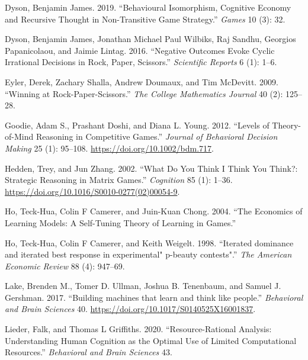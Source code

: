 \documentclass[smallextended]{svjour3}       %
\newlength{\cslhangindent}
\newenvironment{CSLReferences}[2] %
 {%
  \setlength{\parindent}{0pt}
  \ifodd #1 \everypar{\setlength{\hangindent}{\cslhangindent}}\ignorespaces\fi
  \ifnum #2 > 0
  \setlength{\parskip}{#2\baselineskip}
  \fi
 }%
 {}
\begin{document}
\begin{CSLReferences}{1}{0}
\leavevmode{}%
Dyson, Benjamin James. 2019. {``Behavioural Isomorphism, Cognitive
Economy and Recursive Thought in Non-Transitive Game Strategy.''}
\emph{Games} 10 (3): 32.

\leavevmode{}%
Dyson, Benjamin James, Jonathan Michael Paul Wilbiks, Raj Sandhu,
Georgios Papanicolaou, and Jaimie Lintag. 2016. {``Negative Outcomes
Evoke Cyclic Irrational Decisions in Rock, Paper, Scissors.''}
\emph{Scientific Reports} 6 (1): 1--6.

\leavevmode{}%
Eyler, Derek, Zachary Shalla, Andrew Doumaux, and Tim McDevitt. 2009.
{``Winning at Rock-Paper-Scissors.''} \emph{The College Mathematics
Journal} 40 (2): 125--28.

\leavevmode{}%
Goodie, Adam S., Prashant Doshi, and Diana L. Young. 2012. {``Levels of
Theory-of-Mind Reasoning in Competitive Games.''} \emph{Journal of
Behavioral Decision Making} 25 (1): 95--108.
\url{https://doi.org/10.1002/bdm.717}.

\leavevmode{}%
Hedden, Trey, and Jun Zhang. 2002. {``What Do You Think {I} Think You
Think?: Strategic Reasoning in Matrix Games.''} \emph{Cognition} 85 (1):
1--36. \url{https://doi.org/10.1016/S0010-0277(02)00054-9}.

\leavevmode{}%
Ho, Teck-Hua, Colin F Camerer, and Juin-Kuan Chong. 2004. {``The
Economics of Learning Models: A Self-Tuning Theory of Learning in
Games.''}

\leavevmode{}%
Ho, Teck-Hua, Colin F Camerer, and Keith Weigelt. 1998. {``{Iterated
dominance and iterated best response in experimental" p-beauty
contests"}.''} \emph{The American Economic Review} 88 (4): 947--69.

\leavevmode{}%
Lake, Brenden M., Tomer D. Ullman, Joshua B. Tenenbaum, and Samuel J.
Gershman. 2017. {``{Building machines that learn and think like
people}.''} \emph{Behavioral and Brain Sciences} 40.
\url{https://doi.org/10.1017/S0140525X16001837}.

\leavevmode{}%
Lieder, Falk, and Thomas L Griffiths. 2020. {``Resource-Rational
Analysis: Understanding Human Cognition as the Optimal Use of Limited
Computational Resources.''} \emph{Behavioral and Brain Sciences} 43.


\end{CSLReferences}
\end{document}

